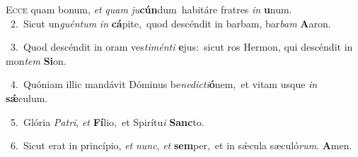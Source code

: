 \lettrine{\initial\textcolor{\initialcolor}{E}}{cce} quam bonum, \textit{et} \textit{quam} \textit{ju}\-\textbf{cún}dum~\star habitáre fratres \textit{in} \textbf{u}\-num.\\
{\numbfont\textcolor{\numbcolor}{~2.}}~Sicut un\-\textit{guén}\-\textit{tum} \textit{in} \textbf{cá}\-pite,~\star quod descéndit in barbam, bar\textit{bam} \textbf{A}\-aron.\par
{\numbfont\textcolor{\numbcolor}{~3.}}~Quod descéndit in oram ves\-\textit{ti}\-\textit{mén}\textit{ti} \textbf{e}\-jus:~\star sicut ros Hermon, qui descéndit in mon\textit{tem} \textbf{Si}\-on.\par
{\numbfont\textcolor{\numbcolor}{~4.}}~Quóniam illic mandávit Dóminus be\-\textit{ne}\-\textit{dic}\textit{ti}\textbf{ó}nem,~\star et vitam usque \textit{in} \textbf{sǽ}\-culum.\par
{\numbfont\textcolor{\numbcolor}{~5.}}~Glória \textit{Pa}\-\textit{tri}, \textit{et} \textbf{Fí}\-lio,~\star et Spirítu\textit{i} \textbf{Sanc}\-to.\par
{\numbfont\textcolor{\numbcolor}{~6.}}~Sicut erat in princípio, \textit{et} \textit{nunc}\-, \textit{et} \textbf{sem}\-per,~\star et in sǽcula sæculó\-\textit{rum}\-. \textbf{A}\-men.\par
